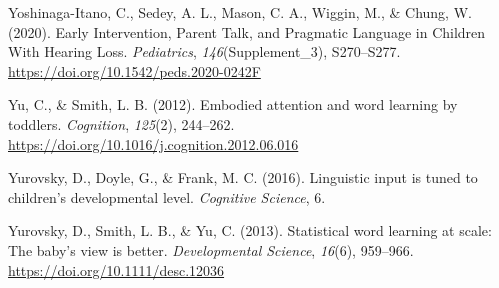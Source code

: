 \documentclass[
  man,floatsintext]{apa6}
\newlength{\cslhangindent}
\newlength{\cslentryspacingunit} %
\newenvironment{CSLReferences}[2] %
 {%
  \setlength{\parindent}{0pt}
  \ifodd #1
  \let\oldpar\par
  \def\par{\hangindent=\cslhangindent\oldpar}
  \fi
  \setlength{\parskip}{#2\cslentryspacingunit}
 }%
 {}
\begin{document}
\begin{CSLReferences}{1}{0}
\leavevmode{}%
Yoshinaga-Itano, C., Sedey, A. L., Mason, C. A., Wiggin, M., \& Chung, W. (2020). Early {Intervention}, {Parent Talk}, and {Pragmatic Language} in {Children With Hearing Loss}. \emph{Pediatrics}, \emph{146}(Supplement\_3), S270--S277. \url{https://doi.org/10.1542/peds.2020-0242F}

\leavevmode{}%
Yu, C., \& Smith, L. B. (2012). Embodied attention and word learning by toddlers. \emph{Cognition}, \emph{125}(2), 244--262. \url{https://doi.org/10.1016/j.cognition.2012.06.016}

\leavevmode{}%
Yurovsky, D., Doyle, G., \& Frank, M. C. (2016). Linguistic input is tuned to children's developmental level. \emph{Cognitive Science}, 6.

\leavevmode{}%
Yurovsky, D., Smith, L. B., \& Yu, C. (2013). Statistical word learning at scale: The baby's view is better. \emph{Developmental Science}, \emph{16}(6), 959--966. \url{https://doi.org/10.1111/desc.12036}

\end{CSLReferences}
\end{document}
